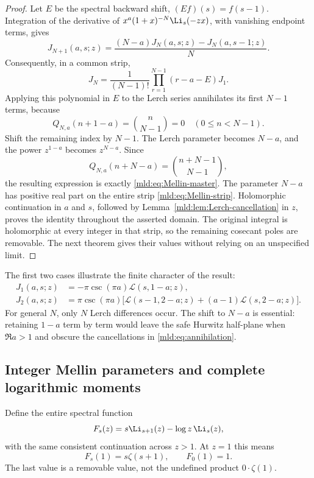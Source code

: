 \begin{proof}
Let $E$ be the spectral backward shift, $(Ef)(s)=f(s-1)$. Integration of the derivative of $x^a(1+x)^{-N}\Li_s(-zx)$, with vanishing endpoint terms, gives
\begin{equation}\label{mld:eq:JN-recurrence}
 J_{N+1}(a,s;z)
       =\frac{(N-a)J_N(a,s;z)-J_N(a,s-1;z)}{N}.
\end{equation}
Consequently, in a common strip,
\[
 J_N=\frac1{(N-1)!}\prod_{r=1}^{N-1}(r-a-E)J_1.
\]
Applying this polynomial in $E$ to the Lerch series annihilates its first $N-1$ terms, because
\begin{equation}\label{mld:eq:annihilation}
 Q_{N,a}(n+1-a)=\binom n{N-1}=0
       \quad(0\le n<N-1).
\end{equation}
Shift the remaining index by $N-1$. The Lerch parameter becomes $N-a$, and the power $z^{1-a}$ becomes $z^{N-a}$. Since
\[
 Q_{N,a}(n+N-a)=\binom{n+N-1}{N-1},
\]
the resulting expression is exactly \eqref{mld:eq:Mellin-master}. The parameter $N-a$ has positive real part on the entire strip \eqref{mld:eq:Mellin-strip}. Holomorphic continuation in $a$ and $s$, followed by Lemma~\ref{mld:lem:Lerch-cancellation} in $z$, proves the identity throughout the asserted domain. The original integral is holomorphic at every integer in that strip, so the remaining cosecant poles are removable. The next theorem gives their values without relying on an unspecified limit.
\end{proof}

The first two cases illustrate the finite character of the result:
\begin{align}
 J_1(a,s;z)&=-\pi\csc(\pi a)\mathcal L(s,1-a;z),\label{mld:eq:J1}\\
 J_2(a,s;z)&=\pi\csc(\pi a)
       \big[\mathcal L(s-1,2-a;z)
                    +(a-1)\mathcal L(s,2-a;z)\big].\label{mld:eq:J2}
\end{align}
For general $N$, only $N$ Lerch differences occur. The shift to $N-a$ is essential: retaining $1-a$ term by term would leave the safe Hurwitz half-plane when $\Re a>1$ and obscure the cancellations in \eqref{mld:eq:annihilation}.

\subsection{Integer Mellin parameters and complete logarithmic moments}

Define the entire spectral function
\begin{equation}\label{mld:eq:F-definition}
 F_s(z)=s\Li_{s+1}(z)-\log z\,\Li_s(z),
\end{equation}
with the same consistent continuation across $z>1$. At $z=1$ this means
\begin{equation}\label{mld:eq:F-unit}
 F_s(1)=s\zeta(s+1),\qquad F_0(1)=1.
\end{equation}
The last value is a removable value, not the undefined product $0\cdot\zeta(1)$.

